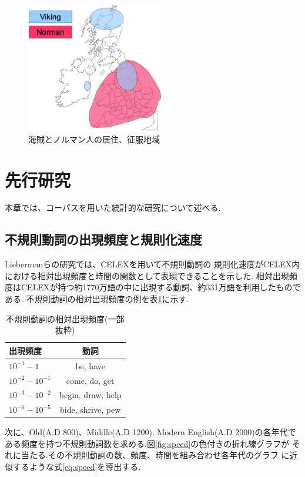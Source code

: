 \documentclass[10.5pt, a4j, twocolumn]{jsarticle}
\begin{document}
\begin{figure}[htbp]
 \centering
 \includegraphics[width=6cm]{viking_nrman.eps}
 \caption{海賊とノルマン人の居住、征服地域\label{fig:viking_nrman}}
\end{figure}

\section{先行研究}\label{sec:relative_work}
本章では、コーパスを用いた統計的な研究について述べる.
\subsection{不規則動詞の出現頻度と規則化速度}
Liebermanらの研究\cite{Lieberman}では、CELEX\cite{celex}を用いて不規則動詞の
規則化速度がCELEX内における相対出現頻度と時間の関数として表現できることを示した.
相対出現頻度はCELEXが持つ約1770万語の中に出現する動詞、約331万語を利用したものである.
不規則動詞の相対出現頻度の例を表\ref{tab:freq}に示す.

{\small
\begin{table}[htbp]
 \centering
 \caption{不規則動詞の相対出現頻度(一部抜粋)\label{tab:freq}}
\small
 \begin{tabular}{l|c}
  \hline
  出現頻度 & 動詞 \\
  \hline
  $10^{-1} - 1$ & be, have \\
  \hline
  $10^{-2} - 10^{-1}$ & come, do, get \\
  \hline
  $10^{-3} - 10^{-2}$ & begin, draw, help  \\
  \hline
  \hline
  $10^{-6} - 10^{-5}$ & bide, shrive, pew\\
  \hline
\end{tabular}
\end{table}
}

次に、Old(A.D 800)、Middle(A.D 1200), Modern English(A.D 2000)の各年代で
ある頻度を持つ不規則動詞数を求める.図\ref{fig:speed}の色付きの折れ線グラフが
それに当たる.その不規則動詞の数、頻度、時間を組み合わせ各年代のグラフ
に近似するような式\ref{eq:speed}を導出する.
\end{document}
